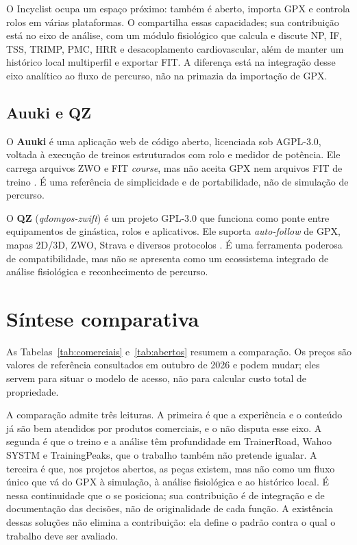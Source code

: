 O Incyclist ocupa um espaço próximo: também é aberto, importa GPX e controla
rolos em várias plataformas. O \argus{} compartilha essas capacidades; sua
contribuição está no eixo de análise, com um módulo fisiológico que calcula e
discute NP, IF, TSS, TRIMP, PMC, HRR e desacoplamento cardiovascular, além de
manter um histórico local multiperfil e exportar FIT. A diferença está na
integração desse eixo analítico ao fluxo de percurso, não na primazia da
importação de GPX.

\subsection{Auuki e QZ}
\label{sec:auuki-qz}

O \textbf{Auuki} é uma aplicação web de código aberto, licenciada sob AGPL-3.0,
voltada à execução de treinos estruturados com rolo e medidor de potência.
Ele carrega arquivos ZWO e FIT \textit{course}, mas não aceita GPX nem arquivos
FIT de treino \cite{auuki_site}. É uma referência de simplicidade e de
portabilidade, não de simulação de percurso.

O \textbf{QZ} (\textit{qdomyos-zwift}) é um projeto GPL-3.0 que funciona como
ponte entre equipamentos de ginástica, rolos e aplicativos. Ele suporta
\textit{auto-follow} de GPX, mapas 2D/3D, ZWO, Strava e diversos protocolos
\cite{qz_github}. É uma ferramenta poderosa de compatibilidade, mas não se
apresenta como um ecossistema integrado de análise fisiológica e reconhecimento
de percurso.

\section{Síntese comparativa}
\label{sec:sintese-comparativa}

As Tabelas~\ref{tab:comerciais} e~\ref{tab:abertos} resumem a comparação. Os
preços são valores de referência consultados em outubro de 2026 e podem mudar;
eles servem para situar o modelo de acesso, não para calcular custo total de
propriedade.

A comparação admite três leituras. A primeira é que a experiência e o
conteúdo já são bem atendidos por produtos comerciais, e o \argus{} não
disputa esse eixo. A segunda é que o treino e a análise têm profundidade em
TrainerRoad, Wahoo SYSTM e TrainingPeaks, que o trabalho também não pretende
igualar. A terceira é que, nos projetos abertos, as peças existem, mas não como
um fluxo único que vá do GPX à simulação, à análise fisiológica e ao histórico
local. É nessa continuidade que o \argus{} se posiciona; sua contribuição é de
integração e de documentação das decisões, não de originalidade de cada função.
A existência dessas soluções não elimina a contribuição: ela define o padrão
contra o qual o trabalho deve ser avaliado.

